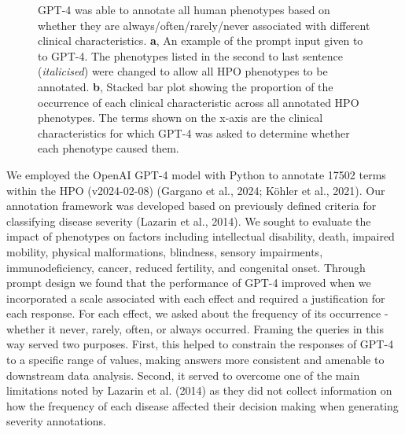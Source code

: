 \documentclass[
]{agujournal2019}
\begin{document}
\label{cell-fig-occurrence}
\begin{figure}[H]


\caption{\label{fig-occurrence}GPT-4 was able to annotate all human
phenotypes based on whether they are always/often/rarely/never
associated with different clinical characteristics. \textbf{a}, An
example of the prompt input given to to GPT-4. The phenotypes listed in
the second to last sentence (\emph{italicised}) were changed to allow
all HPO phenotypes to be annotated. \textbf{b}, Stacked bar plot showing
the proportion of the occurrence of each clinical characteristic across
all annotated HPO phenotypes. The terms shown on the x-axis are the
clinical characteristics for which GPT-4 was asked to determine whether
each phenotype caused them.}

\end{figure}%

We employed the OpenAI GPT-4 model with Python to annotate 17502 terms
within the HPO (v2024-02-08) (Gargano et al., 2024; Köhler et al.,
2021). Our annotation framework was developed based on previously
defined criteria for classifying disease severity (Lazarin et al.,
2014). We sought to evaluate the impact of phenotypes on factors
including intellectual disability, death, impaired mobility, physical
malformations, blindness, sensory impairments, immunodeficiency, cancer,
reduced fertility, and congenital onset. Through prompt design we found
that the performance of GPT-4 improved when we incorporated a scale
associated with each effect and required a justification for each
response. For each effect, we asked about the frequency of its
occurrence - whether it never, rarely, often, or always occurred.
Framing the queries in this way served two purposes. First, this helped
to constrain the responses of GPT-4 to a specific range of values,
making answers more consistent and amenable to downstream data analysis.
Second, it served to overcome one of the main limitations noted by
Lazarin et al. (2014) as they did not collect information on how the
frequency of each disease affected their decision making when generating
severity annotations.
\end{document}

